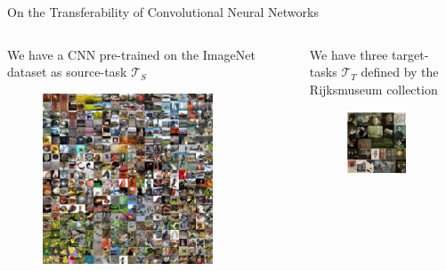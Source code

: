 \documentclass{beamer}
\begin{document}
\begin{frame}{On the Transferability of Convolutional Neural Networks}

	\begin{columns}
		\begin{column}{.5\textwidth}
			We have a CNN pre-trained on the ImageNet dataset as source-task $\mathcal{T}_S$ 

			\begin{figure}
				\includegraphics[width=0.8\textwidth]{figures/imagenet}
			\end{figure}

		\end{column}
		
		\begin{column}{.5\textwidth}
			We have three target-tasks $\mathcal{T}_T$ defined by the Rijksmuseum collection

			\begin{figure}
				\includegraphics[width=0.85\textwidth]{figures/rijks}
			\end{figure}


\end{column}
\end{columns}
\end{frame}
\end{document}
